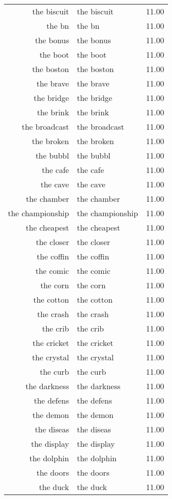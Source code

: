 \begin{table}[ht]
\begin{tabular}{rlr}
  the biscuit & the biscuit & 11.00 \\ 
  the bn & the bn & 11.00 \\ 
  the bonus & the bonus & 11.00 \\ 
  the boot & the boot & 11.00 \\ 
  the boston & the boston & 11.00 \\ 
  the brave & the brave & 11.00 \\ 
  the bridge & the bridge & 11.00 \\ 
  the brink & the brink & 11.00 \\ 
  the broadcast & the broadcast & 11.00 \\ 
  the broken & the broken & 11.00 \\ 
  the bubbl & the bubbl & 11.00 \\ 
  the cafe & the cafe & 11.00 \\ 
  the cave & the cave & 11.00 \\ 
  the chamber & the chamber & 11.00 \\ 
  the championship & the championship & 11.00 \\ 
  the cheapest & the cheapest & 11.00 \\ 
  the closer & the closer & 11.00 \\ 
  the coffin & the coffin & 11.00 \\ 
  the comic & the comic & 11.00 \\ 
  the corn & the corn & 11.00 \\ 
  the cotton & the cotton & 11.00 \\ 
  the crash & the crash & 11.00 \\ 
  the crib & the crib & 11.00 \\ 
  the cricket & the cricket & 11.00 \\ 
  the crystal & the crystal & 11.00 \\ 
  the curb & the curb & 11.00 \\ 
  the darkness & the darkness & 11.00 \\ 
  the defens & the defens & 11.00 \\ 
  the demon & the demon & 11.00 \\ 
  the diseas & the diseas & 11.00 \\ 
  the display & the display & 11.00 \\ 
  the dolphin & the dolphin & 11.00 \\ 
  the doors & the doors & 11.00 \\ 
  the duck & the duck & 11.00 \\ 

\end{tabular}
\end{table}
